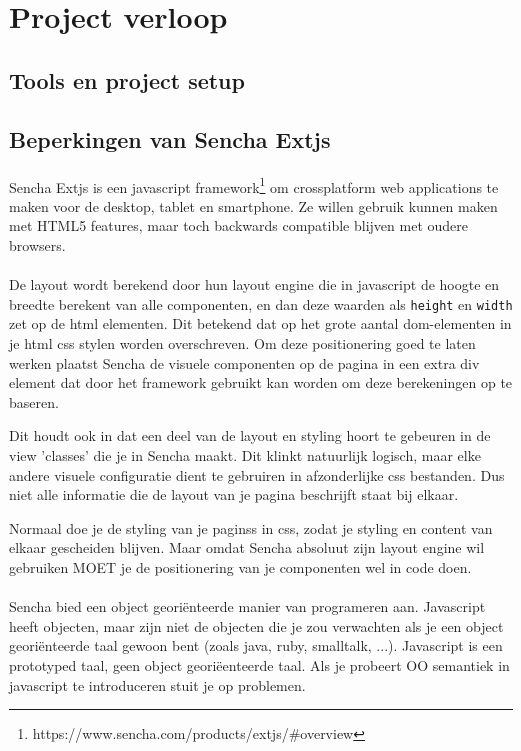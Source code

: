 \section {Project verloop}

\subsection {Tools en project setup}


\subsection {Beperkingen van Sencha Extjs}

\paragraph {} Sencha Extjs is een javascript
framework\footnote{https://www.sencha.com/products/extjs/\#overview} om crossplatform web
applications te maken voor de desktop, tablet en smartphone. Ze willen gebruik kunnen maken
met HTML5 features, maar toch backwards compatible blijven met oudere browsers.

\paragraph {} De layout wordt berekend door hun layout engine die in javascript de hoogte
en breedte berekent van alle componenten, en dan deze waarden als \lstinline{height} en
\lstinline{width} zet op de html elementen. Dit betekend dat op het grote aantal dom-elementen
in je html css stylen worden overschreven. Om deze positionering goed te laten
werken plaatst Sencha de visuele componenten op de pagina in een extra div element dat door het
framework gebruikt kan worden om deze berekeningen op te baseren.

Dit houdt ook in dat een deel van de layout en styling hoort te gebeuren in de view
'classes' die je in Sencha maakt. Dit klinkt natuurlijk logisch, maar elke andere visuele
configuratie dient te gebruiren in afzonderlijke css bestanden. Dus niet alle informatie
die de layout van je pagina beschrijft staat bij elkaar.

Normaal doe je de styling van je paginss in css, zodat je styling en content van elkaar
gescheiden blijven. Maar omdat Sencha absoluut zijn layout engine wil gebruiken MOET je de
positionering van je componenten wel in code doen.

\paragraph {} Sencha bied een object georiënteerde manier van programeren aan. Javascript
heeft objecten, maar zijn niet de objecten die je zou verwachten als je een object
georiënteerde taal gewoon bent (zoals java, ruby, smalltalk, ...). Javascript is een
prototyped taal, geen object georiëenteerde taal. Als je probeert OO semantiek in
javascript te introduceren stuit je op problemen.

